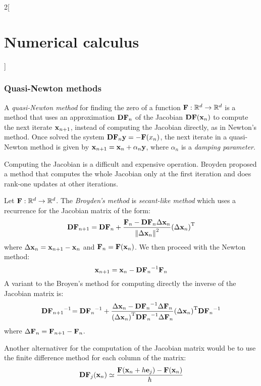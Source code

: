 \documentclass[../../../main_math.tex]{subfiles}
\begin{document}
\begin{multicols}{2}[\section{Numerical calculus}]
  \subsubsection{Quasi-Newton methods}
  \begin{definition}
    A \emph{quasi-Newton method} for finding the zero of a function $\boldsymbol{\mathrm{F}}:\mathbb{R}^d\rightarrow\mathbb{R}^d$ is a method that uses an approximation $\boldsymbol{\mathrm{DF}}_n$ of the Jacobian $\boldsymbol{\mathrm{DF}}(\boldsymbol{\mathrm{x}}_n)$ to compute the next iterate $\boldsymbol{\mathrm{x}}_{n+1}$, instead of computing the Jacobian directly, as in Newton's method. Once solved the system $\boldsymbol{\mathrm{DF}}_n\boldsymbol{\mathrm{y}} = -\boldsymbol{\mathrm{F}}(x_n)$, the next iterate in a quasi-Newton method is given by $\boldsymbol{\mathrm{x}}_{n+1}=\boldsymbol{\mathrm{x}}_n+\alpha_n\boldsymbol{\mathrm{y}}$, where $\alpha_n$ is a \emph{damping parameter}.
  \end{definition}
  \begin{remark}
    Computing the Jacobian is a difficult and expensive operation. Broyden proposed a method that computes the whole Jacobian only at the first iteration and does rank-one updates at other iterations.
  \end{remark}
  \begin{definition}
    Let $\boldsymbol{\mathrm{F}}:\mathbb{R}^d\rightarrow\mathbb{R}^d$. The \emph{Broyden's method} is \emph{secant-like method} which uses a recurrence for the Jacobian matrix of the form:
    $$
      \boldsymbol{\mathrm{DF}}_{n+1}=\boldsymbol{\mathrm{DF}}_n+\frac{\boldsymbol{\mathrm{F}}_n-\boldsymbol{\mathrm{DF}}_n\Delta\boldsymbol{\mathrm{x}}_n}{\left\|\Delta\boldsymbol{\mathrm{x}}_n\right\|^2}{(\Delta\boldsymbol{\mathrm{x}}_n)}^{\mathrm{T}}
    $$
    where $\Delta\boldsymbol{\mathrm{x}}_n=\boldsymbol{\mathrm{x}}_{n+1}-\boldsymbol{\mathrm{x}}_n$ and $\boldsymbol{\mathrm{F}}_n=\boldsymbol{\mathrm{F}}(\boldsymbol{\mathrm{x}}_n)$. We then proceed with the Newton method:
    $$
      \boldsymbol{\mathrm{x}}_{n+1}=\boldsymbol{\mathrm{x}}_n-{\boldsymbol{\mathrm{DF}}_{n}}^{-1}\boldsymbol{\mathrm{F}}_n
    $$
    A variant to the Broyen's method for computing directly the inverse of the Jacobian matrix is:
    $$
      {\boldsymbol{\mathrm{DF}}_{n+1}}^{-1}\!={\boldsymbol{\mathrm{DF}}_n}^{-1}+\frac{\Delta\boldsymbol{\mathrm{x}}_n-{\boldsymbol{\mathrm{DF}}_n}^{-1}\Delta\boldsymbol{\mathrm{F}}_n}{{(\Delta\boldsymbol{\mathrm{x}}_n)}^{\mathrm{T}}{\boldsymbol{\mathrm{DF}}_n}^{-1}\Delta\boldsymbol{\mathrm{F}}_n}{(\Delta\boldsymbol{\mathrm{x}}_n)}^{\mathrm{T}}{\boldsymbol{\mathrm{DF}}_n}^{-1}
    $$
    where $\Delta\boldsymbol{\mathrm{F}}_n=\boldsymbol{\mathrm{F}}_{n+1}-\boldsymbol{\mathrm{F}}_n$.
  \end{definition}
  \begin{remark}
    Another alternativer for the computation of the Jacobian matrix would be to use the finite difference method for each column of the matrix:
    $$
      \boldsymbol{\mathrm{DF}}_{j}(\boldsymbol{\mathrm{x}}_n)\simeq\frac{\boldsymbol{\mathrm{F}}(\boldsymbol{\mathrm{x}}_n+h\boldsymbol{\mathrm{e}}_j)-\boldsymbol{\mathrm{F}}(\boldsymbol{\mathrm{x}}_n)}{h}
    $$
  \end{remark}

\end{multicols}
\end{document}
